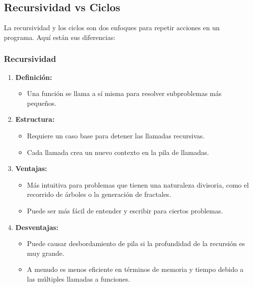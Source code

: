 \subsection{Recursividad vs Ciclos}

La recursividad y los ciclos son dos enfoques para repetir acciones en
un programa. Aquí están sus diferencias:

\subsubsection{Recursividad}

\begin{enumerate}
\item
  \textbf{Definición:}

  \begin{itemize}
  \item
    Una función se llama a sí misma para resolver subproblemas más
    pequeños.
  \end{itemize}
\item
  \textbf{Estructura:}

  \begin{itemize}
  \item
    Requiere un caso base para detener las llamadas recursivas.
  \item
    Cada llamada crea un nuevo contexto en la pila de llamadas.
  \end{itemize}
\item
  \textbf{Ventajas:}

  \begin{itemize}
  \item
    Más intuitiva para problemas que tienen una naturaleza divisoria,
    como el recorrido de árboles o la generación de fractales.
  \item
    Puede ser más fácil de entender y escribir para ciertos problemas.
  \end{itemize}
\item
  \textbf{Desventajas:}

  \begin{itemize}
  \item
    Puede causar desbordamiento de pila si la profundidad de la
    recursión es muy grande.
  \item
    A menudo es menos eficiente en términos de memoria y tiempo debido a
    las múltiples llamadas a funciones.
  \end{itemize}
\end{enumerate}

